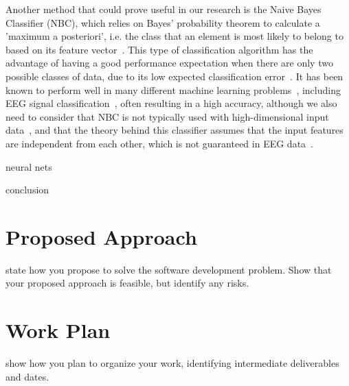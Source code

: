 \documentclass{mprop}
\begin{document}
Another method that could prove useful in our research is the Naive Bayes Classifier (NBC), which relies on Bayes' probability theorem to calculate a 'maximum a posteriori', i.e. the class that an element is most likely to belong to based on its feature vector~\cite{rish_empirical_2001}. This type of classification algorithm has the advantage of having a good performance expectation when there are only two possible classes of data, due to its low expected classification error~\cite{rish_empirical_2001}. It has been known to perform well in many different machine learning problems~\cite{rish_empirical_2001, chen_automated_2012}, including EEG signal classification~\cite{vuckovic_prediction_2018}, often resulting in a high accuracy, although we also need to consider that NBC is not typically used with high-dimensional input data~\cite{chen_automated_2012}, and that the theory behind this classifier assumes that the input features are independent from each other, which is not guaranteed in EEG data~\cite{gallardo_transferable_2017}.

neural nets

conclusion


\section{Proposed Approach}

state how you propose to solve the software development problem. Show that your proposed approach is feasible, but identify any risks.

\section{Work Plan}

show how you plan to organize your work, identifying intermediate deliverables and dates.



\end{document}
